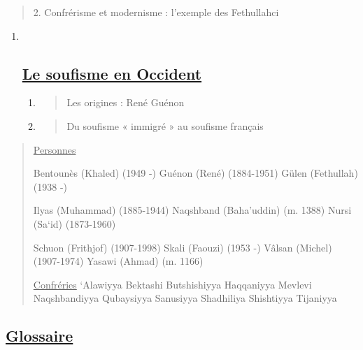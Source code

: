 \begin{quote}
2. Confrérisme et modernisme : l'exemple des Fethullahci
\end{quote}

\begin{enumerate}
\def\labelenumi{\Roman{enumi}.}
\setcounter{enumi}{3}
\item ~
  \hypertarget{le-soufisme-en-occident}{%
  \subsection{\texorpdfstring{\underline{Le soufisme en
  Occident}}{Le soufisme en Occident}}\label{le-soufisme-en-occident}}

  \begin{enumerate}
  \def\labelenumii{\arabic{enumii}.}
  \item
    \begin{quote}
    Les origines : René Guénon
    \end{quote}
  \item
    \begin{quote}
    Du soufisme « immigré » au soufisme français
    \end{quote}
  \end{enumerate}
\end{enumerate}

\begin{quote}
\underline{Personnes}

Bentounès (Khaled) (1949 -) Guénon (René) (1884-1951) Gülen (Fethullah)
(1938 -)

Ilyas (Muhammad) (1885-1944) Naqshband (Baha'uddin) (m. 1388) Nursi
(Sa`id) (1873-1960)

Schuon (Frithjof) (1907-1998) Skali (Faouzi) (1953 -) Vâlsan (Michel)
(1907-1974) Yasawi (Ahmad) (m. 1166)

\underline{Confréries} `Alawiyya Bektashi Butshishiyya Haqqaniyya
Mevlevi Naqshbandiyya Qubaysiyya Sanusiyya Shadhiliya Shishtiyya
Tijaniyya
\end{quote}

\hypertarget{glossaire-8}{%
\subsection{\texorpdfstring{\hfill\break
\underline{Glossaire}}{ Glossaire}}\label{glossaire-8}}

